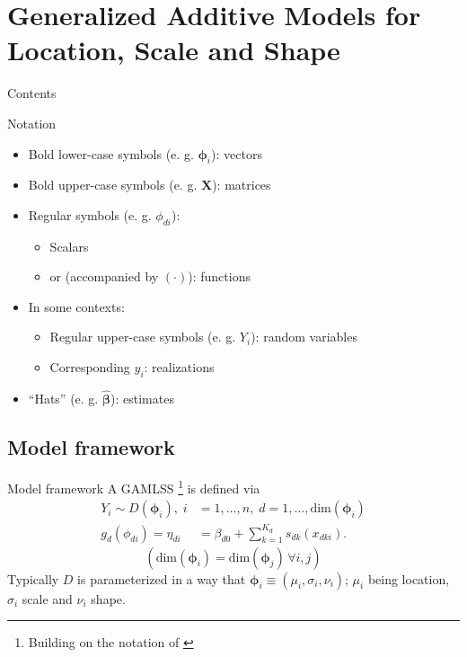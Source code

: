 \documentclass[xcolor=dvipsnames]{beamer}
\begin{document}
\section{Generalized Additive Models for Location, Scale and Shape}
\begin{frame}{Contents}
\tableofcontents[sections={1-2}, currentsection]
\tableofcontents[sections={3-6}]
\end{frame}

\begin{frame}{Notation}
  \begin{itemize}
    \item Bold lower-case symbols (e. g. $\bm{\phi}_i$): vectors
    \item Bold upper-case symbols (e. g. $\bm{X}$): matrices
    \item Regular symbols (e. g. $\phi_{di}$):
    \begin{itemize}
      \item Scalars
      \item or (accompanied by $(\cdot)$): functions
    \end{itemize}
    \item In some contexts:
    \begin{itemize}
      \item Regular upper-case symbols (e. g. $Y_i$): random variables
      \item Corresponding $y_i$: realizations
    \end{itemize}
    \item \enquote{Hats} (e. g. $\hat{\bm{\beta}}$): estimates
  \end{itemize}
\end{frame}

\subsection{Model framework}
\begin{frame}{Model framework}
  A \ac{GAMLSS} \footnote{Building on the notation of \textcite{aeberhard2021robust}} is defined via
  \begin{equation}
  \begin{split}
    Y_i \sim D(\bm{\phi}_i),\; i &= 1, \dots, n,\; d = 1, \dots , \mathrm{dim}(\bm{\phi}_i) \\
    g_d(\phi_{di}) = \eta_{di} &= \beta_{d0} + \displaystyle \sum_{k = 1}^{K_d} s_{dk}(x_{dki}).
  \end{split}
  \end{equation}
  \begin{equation*}
    \left(\mathrm{dim}(\bm{\phi}_i) = \mathrm{dim}(\bm{\phi}_j)\, \forall i,j \right)
  \end{equation*}
  Typically $D$ is parameterized in a way that $\bm{\phi}_i \equiv (\mu_i, \sigma_i, \nu_i)$; $\mu_i$ being location, $\sigma_i$ scale and $\nu_i$ shape.
\end{frame}
\end{document}
